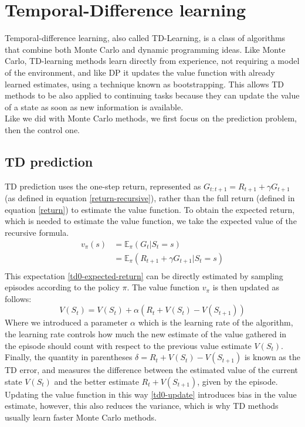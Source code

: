 \section{Temporal-Difference learning}
Temporal-difference learning, also called TD-Learning, is a class of algorithms that combine both Monte Carlo and dynamic programming ideas. Like Monte Carlo, TD-learning methods learn directly from experience, not requiring a model of the environment, and like DP it updates the value function with already learned estimates, using a technique known as bootstrapping. This allows TD methods to be also applied to continuing tasks because they can update the value of a state as soon as new information is available.\\
Like we did with Monte Carlo methods, we first focus on the prediction problem, then the control one.

\subsection{TD prediction}
TD prediction uses the one-step return, represented as $G_{t:t+1} = R_{t+1} + \gamma G_{t+1}$ (as defined in equation \eqref{return-recursive}), rather than the full return (defined in equation \eqref{return}) to estimate the value function. To obtain the expected return, which is needed to estimate the value function, we take the expected value of the recursive formula.
\begin{equation}
    \begin{split}
        v_{\pi}(s) & = \mathds{E}_{\pi}(G_t | S_t = s) \\
        & = \mathds{E}_{\pi}(R_{t+1} + \gamma G_{t+1} | S_t = s)\\
    \end{split}
    \label{td0-expected-return}
\end{equation}
This expectation \eqref{td0-expected-return} can be directly estimated by sampling episodes according to the policy $\pi$. The value function $v_{\pi}$ is then updated as follows:
\begin{equation}
    V(S_t) = V(S_t) + \alpha (R_t + V(S_t) - V(S_{t+1}))
    \label{td0-update}
\end{equation}
Where we introduced a parameter $\alpha$ which is the learning rate of the algorithm, the learning rate controls how much the new estimate of the value gathered in the episode should count with respect to the previous value estimate $V(S_t)$.\\
Finally, the quantity in parentheses $\delta = R_t + V(S_t) - V(S_{t+1})$ is known as the TD error, and measures the difference between the estimated value of the current state $V(S_t)$ and the better estimate $R_t + V(S_{t+1})$, given by the episode.\\
Updating the value function in this way \eqref{td0-update} introduces bias in the value estimate, however, this also reduces the variance, which is why TD methods usually learn faster Monte Carlo methods.

